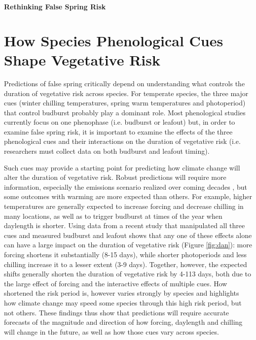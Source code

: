 \documentclass{article}\usepackage[]{graphicx}\usepackage[]{color}
\begin{document}
\noindent \textbf{\Large{Rethinking False Spring Risk}}

\section* {How Species Phenological Cues Shape Vegetative Risk}
Predictions of false spring critically depend on understanding what controls the duration of vegetative risk across species. For temperate species, the three major cues (winter chilling temperatures, spring warm temperatures and photoperiod) that control budburst \citep%
{Chuine2010} probably play a dominant role. Most phenological studies currently focus on one phenophase (i.e. budburst or leafout) but, in order to examine false spring risk, it is important to examine the effects of the three phenological cues and their interactions on the duration of vegetative risk (i.e. researchers must collect data on both budburst and leafout timing).  

Such cues may provide a starting point for predicting how climate change will alter the duration of vegetative risk. Robust predictions will require more information, especially the emissions scenario realized over coming decades \citep{IPCC2014}, but some outcomes with warming are more expected than others. For example, higher temperatures are generally expected to increase forcing and decrease chilling in many locations, as well as to trigger budburst at times of the year when daylength is shorter. Using data from a recent study that manipulated all three cues and measured budburst and leafout \citep{Flynn2018} shows that any one of these effects alone can have a large impact on the duration of vegetative risk (Figure \ref{fig:dan}): more forcing shortens it substantially (8-15 days), while shorter photoperiods and less chilling increase it to a lesser extent (3-9 days). Together, however, the expected shifts generally shorten the duration of vegetative risk by 4-113 days, both due to the large effect of forcing and the interactive effects of multiple cues. How shortened the risk period is, however varies strongly by species and highlights how climate change may speed some species through this high risk period, but not others. These findings thus show that predictions will require accurate forecasts of the magnitude and direction of how forcing, daylength and chilling will change in the future, as well as how those cues vary across species. 
\end{document}
